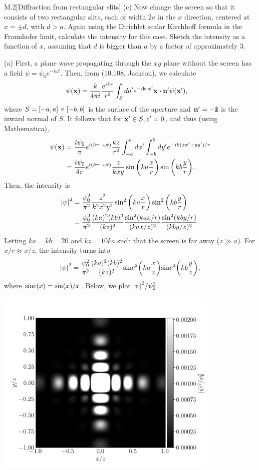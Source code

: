 \documentclass[12pt]{article}
\begin{document}
\begin{problem}{M.2}[Diffraction from rectangular slits]
(c) Now change the screen so that it consists of two rectangular slits, each of
width $2a$ in the $x$ direction, centered at $x=\pm d$, with $d>a$. Again using
the Dirichlet scalar Kirchhoff formula in the Fraunhofer limit, calculate the
intensity for this case. Sketch the intensity as a function of $x$, assuming
that $d$ is bigger than $a$ by a factor of approximately 3.
\begin{solution}
(a) First, a plane wave propagating through the $xy$ plane without the screen 
has a field $\psi=\psi_0e^{-i\omega t}$. Then, from (10.108, Jackson), we 
calculate
\begin{align}
    \psi(\vb{x})
    &=\frac{k}{4\pi i}\frac{e^{ikr}}{r^2}\int_{S}da'e^{-i\vb{k}\vdot\vb{x}'}
    \vb{x}\vdot\vb{n}'\psi(\vb{x}'),
\end{align}
where $S=\qty[-a,a]\times\qty[-b,b]$ is the surface of the aperture and
$\vb{n}'=-\vb{\hat{z}}$ is the inward normal of $S$. It follows that for $\vb{x}'\in
S,z'=0$, and thus (using Mathematica),
\begin{align}
    \psi(\vb{x})
    &=\frac{i\psi_0}{\pi}e^{i(kr-\omega t)}\frac{kz}{r^2}\int_{-a}^adx'
        \int_{-b}^bdy' e^{-ik(xx'+yy')/r}\notag\\
    &=\frac{i\psi_0}{4\pi}e^{i(kr-\omega t)}\frac{z}{kxy}\sin\qty(ka\frac{x}{r})
    \sin\qty(kb\frac{y}{r}).
\end{align}
Then, the intensity is
\begin{align}
    \abs{\psi}^2
    &=\frac{\psi_0^2}{\pi^2}\frac{z^2}{k^2x^2y^2}\sin^2\qty(ka\frac{x}{r})\sin^2\qty(kb\frac{y}{r})\notag\\
    &=\frac{\psi_0^2}{\pi^2}\frac{(ka)^2(kb)^2}{(kz)^2}\frac{\sin^2(kax/r)}{(kax/z)^2}\frac{\sin^2(kby/r)}{(kby/z)^2}.
\end{align}
Letting $ka=kb=20$ and $kz=10ka$ such that the screen is far away ($z\gg a$).
For $x/r\approx x/z$, the intensity turns into
\begin{equation}
    \abs{\psi}^2=\frac{\psi_0^2}{\pi^2}\frac{(ka)^2(kb)^2}{(kz)^2}\text{sinc}^2\qty(ka\frac{x}{z})\text{sinc}^2\qty(kb\frac{y}{z}), 
\end{equation}
where $\text{sinc}(x)=\sin(x)/x$. Below, we plot $\abs{\psi}^2/\psi_0^2$.
\begin{center}
    \includegraphics[width=0.8\textwidth]{p2a.png} 

\end{center}
\end{solution}
\end{problem}
\end{document}
